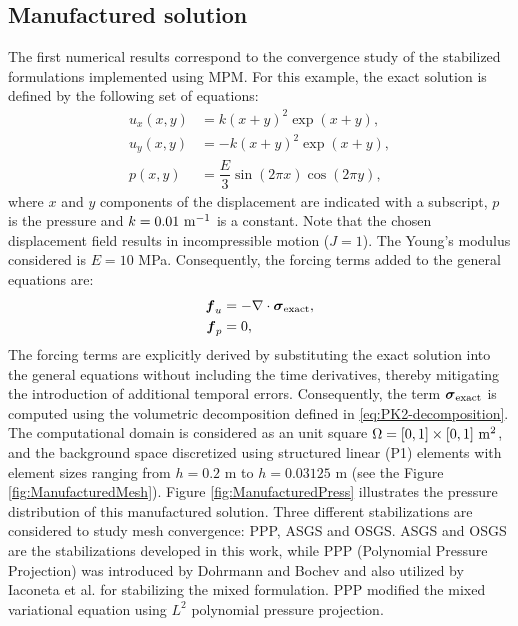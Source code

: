 \documentclass[11pt,english]{article}
\begin{document}
    \subsection{Manufactured solution} \label{sec:Results_Manufactured}
    The first numerical results correspond to the convergence study of the stabilized formulations implemented using MPM. For this example, the exact solution is defined by the following set of equations:
    \begin{align*}
        u_x(x,y)&=k(x+y)^2 \exp(x+y),\\
        u_y(x,y)&=-k(x+y)^2 \exp(x+y),\\
        p(x,y)&=\dfrac{E}{3}\sin(2\pi x) \cos(2\pi y),
    \end{align*}
    where $x$ and $y$ components of the displacement are indicated with a subscript, $p$ is the pressure and $k=0.01\ \rm{m}^{-1}$ is a constant. Note that the chosen displacement field results in incompressible motion ($J=1$). The Young's modulus considered is $E=10$ MPa. Consequently, the forcing terms added to the general equations are: 
    \begin{align*}
        \boldsymbol{f}_u &= - \nabla \cdot \boldsymbol{\sigma}_{\rm exact},\\
        \boldsymbol{f}_{p} &= 0,
    \end{align*}
    The forcing terms are  explicitly derived by substituting the exact solution into the general equations without including the time derivatives, thereby mitigating the introduction of additional temporal errors. Consequently, the term $\boldsymbol{\sigma}_{\rm exact}$ is computed using the volumetric decomposition defined in \eqref{eq:PK2-decomposition}. The computational domain is considered as an unit square $\Omega=[0,1]\times[0,1]\ \rm{m}^2$, and the background space discretized using structured linear (P1) elements with element sizes ranging from $h= 0.2$ m to $h= 0.03125$ m (see the Figure \ref{fig:ManufacturedMesh}). Figure \ref{fig:ManufacturedPress} illustrates the pressure distribution of this manufactured solution. Three different stabilizations are considered to study mesh convergence: PPP, ASGS and OSGS. ASGS and OSGS are the stabilizations developed in this work, while PPP (Polynomial Pressure Projection) was introduced by Dohrmann and Bochev \cite{dohrmann2004stabilized} and also utilized by Iaconeta et al. \cite{iaconeta2019stabilized} for stabilizing the mixed formulation. PPP modified the mixed variational equation using $L^2$ polynomial pressure projection.
    
\end{document}
